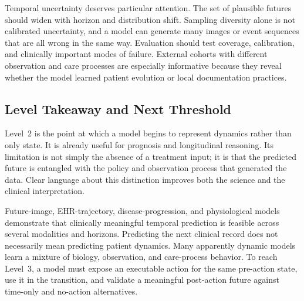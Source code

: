 Temporal uncertainty deserves particular attention. The set of plausible futures should widen with horizon and distribution shift. Sampling diversity alone is not calibrated uncertainty, and a model can generate many images or event sequences that are all wrong in the same way. Evaluation should test coverage, calibration, and clinically important modes of failure. External cohorts with different observation and care processes are especially informative because they reveal whether the model learned patient evolution or local documentation practices.

\subsection{Level Takeaway and Next Threshold}

Level~2 is the point at which a model begins to represent dynamics rather than only state. It is already useful for prognosis and longitudinal reasoning. Its limitation is not simply the absence of a treatment input; it is that the predicted future is entangled with the policy and observation process that generated the data. Clear language about this distinction improves both the science and the clinical interpretation.

\levelsummary
{Future-image, EHR-trajectory, disease-progression, and physiological models demonstrate that clinically meaningful temporal prediction is feasible across several modalities and horizons.}
{Predicting the next clinical record does not necessarily mean predicting patient dynamics. Many apparently dynamic models learn a mixture of biology, observation, and care-process behavior.}
{To reach Level~3, a model must expose an executable action for the same pre-action state, use it in the transition, and validate a meaningful post-action future against time-only and no-action alternatives.}
